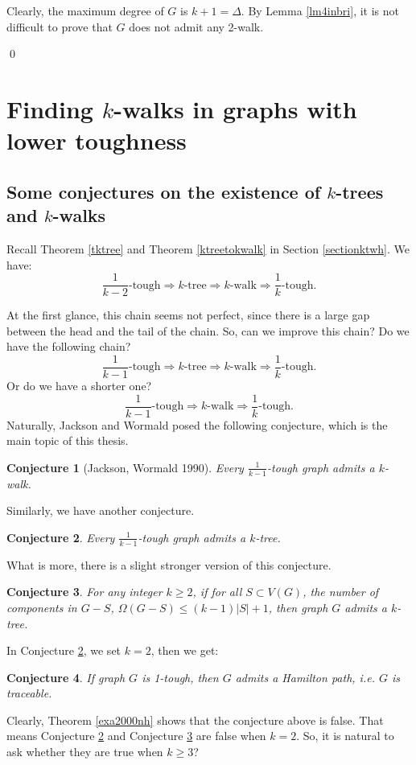 \documentclass[12pt]{report}
\newtheorem{conjecture}{Conjecture}
\begin{document}
Clearly, the maximum degree of $G$ is $k+1=\Delta$. By Lemma \ref{lm4inbri}, it is not difficult to prove that $G$ does not admit any 2-walk.

\qed







\section{Finding $k$-walks in graphs with lower toughness}
\subsection{Some conjectures on the existence of $k$-trees and $k$-walks}
Recall Theorem \ref{tktree} and Theorem \ref{ktreetokwalk} in Section \ref{sectionktwh}. We have:
$$\frac{1}{k-2}\text{-tough}\Rightarrow k\text{-tree}\Rightarrow k\text{-walk}\Rightarrow\frac{1}{k}\text{-tough}.$$


At the first glance, this chain seems not perfect, since there is a large gap between the head and the tail of the chain. So, can we improve this chain? Do we have the following chain?
$$\frac{1}{k-1}\text{-tough}\Rightarrow k\text{-tree}\Rightarrow k\text{-walk}\Rightarrow\frac{1}{k}\text{-tough}.$$
Or do we have a shorter one?
$$\frac{1}{k-1}\text{-tough}\Rightarrow k\text{-walk}\Rightarrow\frac{1}{k}\text{-tough}.$$
Naturally, Jackson and Wormald posed the following conjecture, which is the main topic of this thesis.
\begin{conjecture}[Jackson, Wormald 1990]\label{mainconjjawo1}
Every $\frac{1}{k-1}$-tough graph admits a $k$-walk.
\end{conjecture}

Similarly, we have another conjecture.
\begin{conjecture}\label{main2ktcon}
Every $\frac{1}{k-1}$-tough graph admits a $k$-tree.
\end{conjecture}

What is more, there is a slight stronger version of this conjecture.

\begin{conjecture}\label{main2strdeli}
For any integer $k\ge2$, if for all $S\subset V(G)$, the number of components in $G-S$, $\Omega(G-S)\le (k-1)|S|+1$, then graph $G$ admits a $k$-tree.
\end{conjecture}

In Conjecture \ref{main2ktcon}, we set $k=2$, then we get:
\begin{conjecture}\label{coj1k1thmilpa}
If graph $G$ is 1-tough, then $G$ admits a Hamilton path, i.e. $G$ is traceable.
\end{conjecture}
Clearly, Theorem \ref{exa2000nh} shows that the conjecture above is false. That means Conjecture \ref{main2ktcon} and Conjecture \ref{main2strdeli} are false when $k=2$. So, it is natural to ask whether they are true when $k\ge3$?
\end{document}

